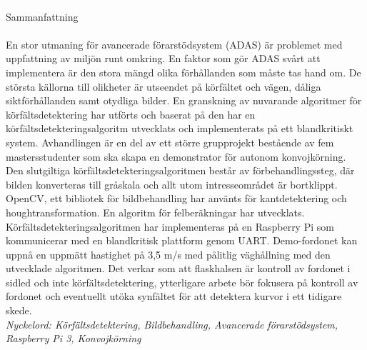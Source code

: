 \textcolor{white}{.}\\[0.5cm]
{\Large Sammanfattning}\\
\textcolor{white}{.}\\
\label{sec:sammanfattning}
En stor utmaning för avancerade förarstödsystem (ADAS) är problemet med uppfattning av miljön runt omkring. En faktor som gör ADAS svårt att implementera är den stora mängd olika förhållanden som måste tas hand om. De största källorna till olikheter är utseendet på körfältet och vägen, dåliga siktförhållanden samt otydliga bilder. En granskning av nuvarande algoritmer för körfältsdetektering har utförts och baserat på den har en körfältsdetekteringsalgoritm utvecklats och implementerats på ett blandkritiskt system. Avhandlingen är en del av ett större grupprojekt bestående av fem mastersstudenter som ska skapa en demonstrator för autonom konvojkörning. Den slutgiltiga körfältsdetekteringsalgoritmen består av förbehandlingssteg, där bilden konverteras till gråskala och allt utom intresseområdet är bortklippt. OpenCV, ett bibliotek för bildbehandling har använts för kantdetektering och houghtransformation. En algoritm för felberäkningar har utvecklats. Körfältsdetekteringsalgoritmen har implementeras på en Raspberry Pi som kommunicerar med en blandkritisk plattform genom UART. Demo-fordonet kan uppnå en uppmätt hastighet på 3,5 m/s med pålitlig väghållning med den utvecklade algoritmen. Det verkar som att flaskhalsen är kontroll av fordonet i sidled och inte körfältsdetektering, ytterligare arbete bör fokusera på kontroll av fordonet och eventuellt utöka synfältet för att detektera kurvor i ett tidigare skede.\\

\noindent
\textit{Nyckelord: Körfältsdetektering, Bildbehandling, Avancerade förarstödsystem, Raspberry Pi 3, Konvojkörning}

\setcounter{page}{1}
\vspace{0.25cm}

